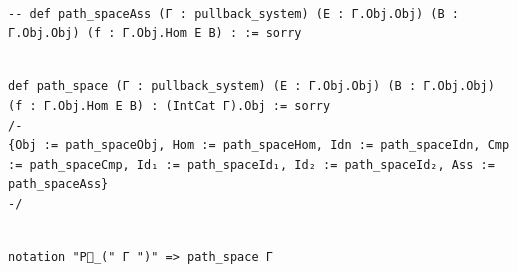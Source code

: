 \documentclass{book}
\theoremstyle{definition}
\newcounter{lcounter}
\begin{document}
\begin{center}
\begin{tcolorbox}[width=5in,colback={white},title={\begin{center}\texttt{Lean \thelcounter} \addtocounter{lcounter}{1}  \end{center}},colbacktitle=Blue,coltitle=black]
\begin{verbatim}

-- def path_spaceAss (Γ : pullback_system) (E : Γ.Obj.Obj) (B : Γ.Obj.Obj) (f : Γ.Obj.Hom E B) : := sorry

\end{verbatim}
\end{tcolorbox}
\end{center}

\begin{center}
\begin{tcolorbox}[width=5in,colback={white},title={\begin{center}\texttt{Lean \thelcounter} \addtocounter{lcounter}{1}  \end{center}},colbacktitle=Blue,coltitle=black]
\begin{verbatim}

def path_space (Γ : pullback_system) (E : Γ.Obj.Obj) (B : Γ.Obj.Obj) (f : Γ.Obj.Hom E B) : (IntCat Γ).Obj := sorry 
/-
{Obj := path_spaceObj, Hom := path_spaceHom, Idn := path_spaceIdn, Cmp := path_spaceCmp, Id₁ := path_spaceId₁, Id₂ := path_spaceId₂, Ass := path_spaceAss}
-/

\end{verbatim}
\end{tcolorbox}
\end{center}

\begin{center}
\begin{tcolorbox}[width=5in,colback={white},title={\begin{center}\texttt{Lean \thelcounter} \addtocounter{lcounter}{1}  \end{center}},colbacktitle=Blue,coltitle=black]
\begin{verbatim}

notation "P⃗_(" Γ ")" => path_space Γ

\end{verbatim}
\end{tcolorbox}
\end{center}
\end{document}
